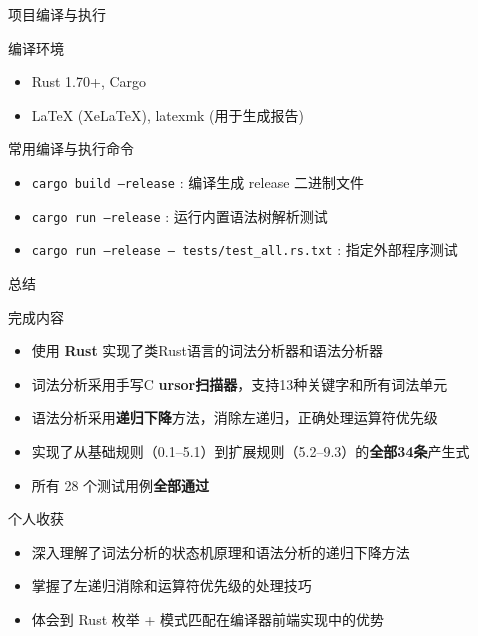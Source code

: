 \documentclass[aspectratio=169]{ctexbeamer}
\begin{document}
\begin{frame}{项目编译与执行}
    \begin{block}{编译环境}
        \begin{itemize}
            \item Rust 1.70+, Cargo
            \item LaTeX (XeLaTeX), latexmk (用于生成报告)
        \end{itemize}
    \end{block}
    \vfill
    \begin{block}{常用编译与执行命令}
        \begin{itemize}
            \item \texttt{cargo build --release} : 编译生成 release 二进制文件
            \item \texttt{cargo run --release} : 运行内置语法树解析测试
            \item \texttt{cargo run --release -- tests/test\_all.rs.txt} : 指定外部程序测试
        \end{itemize}
    \end{block}
\end{frame}

\begin{frame}{总结}
    \begin{block}{完成内容}
        \begin{itemize}
            \item 使用 \textbf{Rust} 实现了类Rust语言的词法分析器和语法分析器
            \item 词法分析采用手写C \textbf{ursor扫描器}，支持13种关键字和所有词法单元
            \item 语法分析采用\textbf{递归下降}方法，消除左递归，正确处理运算符优先级
            \item 实现了从基础规则（0.1--5.1）到扩展规则（5.2--9.3）的\textbf{全部34条}产生式
            \item 所有 28 个测试用例\textbf{全部通过}
        \end{itemize}
    \end{block}
    \vfill
    \begin{block}{个人收获}
        \begin{itemize}
            \item 深入理解了词法分析的状态机原理和语法分析的递归下降方法
            \item 掌握了左递归消除和运算符优先级的处理技巧
            \item 体会到 Rust 枚举 + 模式匹配在编译器前端实现中的优势
        \end{itemize}
    \end{block}
\end{frame}
\end{document}
